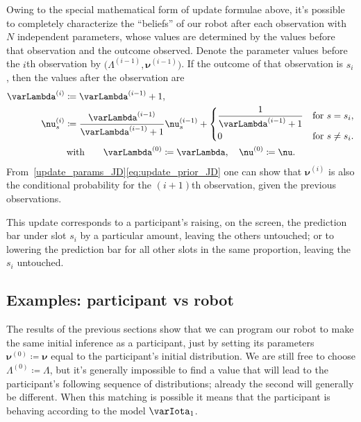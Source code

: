 \documentclass[\ifafour a4paper,12pt,\else a5paper,10pt,\fi%
onecolumn,oneside,article,%
british%
]{memoir}
\theoremstyle{remark}
\theoremstyle{innote}
\newcommand*{\defd}{\coloneqq}
\renewcommand*{\|}{\mathpunct{|}}
\newcommand*{\yI}{\varIota}
\newcommand*{\yMJ}{\yI_1}
\newcommand*{\yN}{\varLambda}
\newcommand*{\yNo}[1]{\yN^{(#1)}}
\newcommand*{\ynn}{\nu}
\newcommand*{\yn}{\bm{\nu}}
\newcommand*{\yno}[1]{\yn^{(#1)}}
\newcommand*{\ynno}[1]{\ynn^{(#1)}}
\begin{document}
Owing to the special mathematical form of update formulae above, it's
possible to completely characterize the \enquote{beliefs} of our robot
after each observation with $N$ independent parameters, whose values are
determined by the values before that observation and the outcome observed.
Denote the parameter values before the $i$th observation by
$\bigl( \yNo{i-1}, \yno{i-1} \bigr)$. If the outcome of that observation is
$s_i$, then the values after the observation are
\begin{equation}
  \label{update_params_JD}
  \begin{gathered}
  \begin{aligned}
    \yNo{i} &\defd \yNo{i-1}+1,
    \\
    \ynno{i}_s &\defd \frac{\yNo{i-1}}{\yNo{i-1}+1}\ynno{i-1}_s +
    \begin{dcases}
      \frac{1}{\yNo{i-1}+1} &\text{for $s=s_{i}$},
      \\
      0 &\text{for $s\ne s_{i}$}.
    \end{dcases}
  \end{aligned}
  \\\text{with}\qquad
  \yNo{0}\defd\yN,
  \quad
  \yno{0} \defd\yn.
  \end{gathered}
\end{equation}
From~\eqref{update_params_JD}\eqref{eq:update_prior_JD} one can show that
$\yno{i}$ is also the conditional probability for the $(i+1)$th
observation, given the previous observations.

This update corresponds to a participant's raising, on the screen, the
prediction bar under slot $s_{i}$ by a particular amount, leaving the
others untouched; or to lowering the prediction bar for all other slots in
the same proportion, leaving the $s_{i}$ untouched.


\subsection{Examples: participant vs robot}
\label{sec:examples_partic_robot}

The results of the previous sections show that we can program our robot to
make the same initial inference as a participant, just by setting its
parameters $\yno{0}\defd\yn$ equal to the participant's initial
distribution. We are still free to choose $\yNo{0}\defd\yN$, but it's
generally impossible to find a value that will lead to the participant's
following sequence of distributions; already the second will generally be
different. When this matching is possible it means that the participant is
behaving according to the model $\yMJ$.
\end{document}
